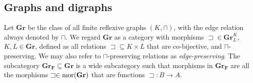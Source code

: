 \documentclass[12pt]{amsart}
\numberwithin{equation}{section}
\theoremstyle{plain}
\newtheorem{proposition}[theorem]{\bf Proposition}
\theoremstyle{definition}
\newcommand \sqsp{\sqsupset}
\newcommand \la{\leftarrow}
\newcommand \mor{{\rm{mor}}}
\newcommand \ob{{\rm{ob}}}
\newcommand \fra{Fra\"{i}ss\'{e}}
\newcommand \GGb{\mathbf{G}}
\newcommand \GGRb{\mathbf{Gr}}
\newcommand \GGRFb{\mathbf{Gr_F}}
\newcommand \KKb{\mathbf{K}}
\newcommand \GGRub{\underline{\mathbf{Gr}}}
\newcommand \It{\mathtt{I}}
\begin{document}


\subsection{Graphs and digraphs} Let $\GGRb$ be the class of all finite reflexive graphs $(K,\sqcap)$, with the edge relation always denoted by $\sqcap$.  We regard $\GGRb$ as a category with morphisms $\sqsp \in \GGRb^K_L$, $K, L \in \GGRb$, defined as all relations  $\sqsp \subseteq K \times L$ that are co-bijective, and  $\sqcap$-preserving. We may also refer to $\sqcap$-preserving relations as \emph{edge-preserving}. %
The subcategory $ \GGRFb \subseteq \GGRb$ is a wide subcategory such that morphisms in $\GGRFb$ are all the morphisms $\sqsp \in \mor(\GGRb)$ that are functions $\sqsp:B \to A$.

\end{document}
